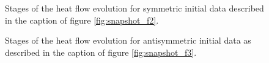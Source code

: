 \begin{figure}[h]
  \centering \advance\leftskip-3cm
  
  \caption{Stages of the heat flow evolution for symmetric initial
    data described in the caption of figure \ref{fig:snapshot_f2}.}
  \label{fig:Stages_f2}
\end{figure}

\begin{figure}[h]
  \centering \advance\leftskip-3cm
  
  \caption{Stages of the heat flow evolution for antisymmetric
    initial data as described in the caption of figure \ref{fig:snapshot_f3}.}
  \label{fig:Stages_f3}
\end{figure}

